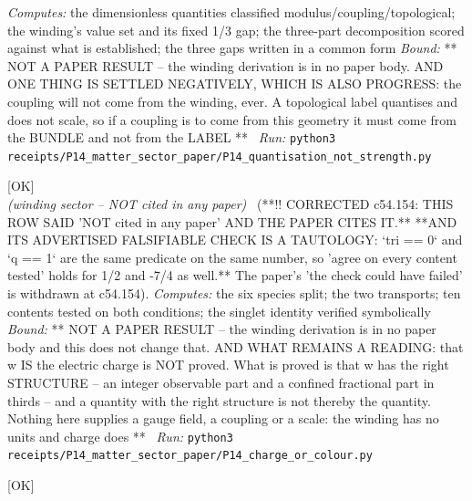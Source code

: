\begin{description}
\emph{Computes:} the dimensionless quantities classified modulus/coupling/topological; the winding's value set and its fixed 1/3 gap; the three-part decomposition scored against what is established; the three gaps written in a common form
 \emph{Bound:} ** NOT A PAPER RESULT -- the winding derivation is in no paper body. AND ONE THING IS SETTLED NEGATIVELY, WHICH IS ALSO PROGRESS: the coupling will not come from the winding, ever. A topological label quantises and does not scale, so if a coupling is to come from this geometry it must come from the BUNDLE and not from the LABEL **
\ \emph{Run:} \texttt{python3 receipts/P14\_matter\_sector\_paper/P14\_quantisation\_not\_strength.py}
\item[\rcptlabel{P14_charge_or_colour}{P14R24}\textbf{P14R24}\quad\texttt{P14\_charge\_or\_colour}]\hfill\textsf{[OK]}\\
\textit{(winding sector -- NOT cited in any paper)} \ (**!! CORRECTED c54.154: THIS ROW SAID 'NOT cited in any paper' AND THE PAPER CITES IT.** **AND ITS ADVERTISED FALSIFIABLE CHECK IS A TAUTOLOGY: `tri == 0` and `q == 1` are the same predicate on the same number, so 'agree on every content tested' holds for 1/2 and -7/4 as well.** The paper's 'the check could have failed' is withdrawn at c54.154). 
\emph{Computes:} the six species split; the two transports; ten contents tested on both conditions; the singlet identity verified symbolically
 \emph{Bound:} ** NOT A PAPER RESULT -- the winding derivation is in no paper body and this does not change that. AND WHAT REMAINS A READING: that w IS the electric charge is NOT proved. What is proved is that w has the right STRUCTURE -- an integer observable part and a confined fractional part in thirds -- and a quantity with the right structure is not thereby the quantity. Nothing here supplies a gauge field, a coupling or a scale: the winding has no units and charge does **
\ \emph{Run:} \texttt{python3 receipts/P14\_matter\_sector\_paper/P14\_charge\_or\_colour.py}
\item[\rcptlabel{P14_route_or_point}{P14R25}\textbf{P14R25}\quad\texttt{P14\_route\_or\_point}]\hfill\textsf{[OK]}\\

\end{description}
